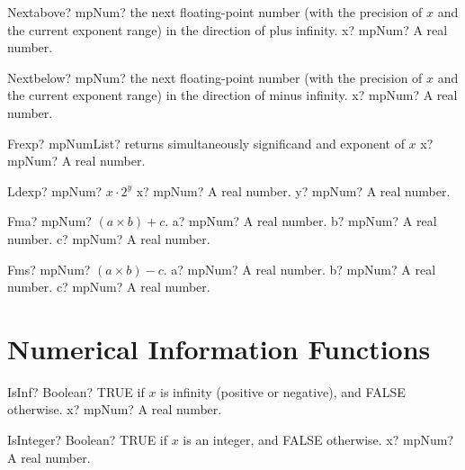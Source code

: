 \documentclass[12pt,a4paper,openany]{book}
\begin{document}
\begin{mpFunctionsExtract}
\mpFunctionOne
{Nextabove? mpNum? the next floating-point number (with the precision of $x$ and the current exponent range) in the direction of plus infinity.}
{x? mpNum? A real number.}
\end{mpFunctionsExtract}

\begin{mpFunctionsExtract}
\mpFunctionOne
{Nextbelow? mpNum? the next floating-point number (with the precision of $x$ and the current exponent range) in the direction of minus infinity.}
{x? mpNum? A real number.}
\end{mpFunctionsExtract}

\begin{mpFunctionsExtract}
\mpFunctionOne
{Frexp? mpNumList? returns simultaneously significand and exponent of $x$}
{x? mpNum? A real number.}
\end{mpFunctionsExtract}

\begin{mpFunctionsExtract}
\mpFunctionTwo
{Ldexp? mpNum? $x \cdot 2^{y}$}
{x? mpNum? A real number.}
{y? mpNum? A real number.}
\end{mpFunctionsExtract}

\begin{mpFunctionsExtract}
\mpFunctionThree
{Fma? mpNum? $(a \times b) + c$.}
{a? mpNum? A real number.}
{b? mpNum? A real number.}
{c? mpNum? A real number.}
\end{mpFunctionsExtract}

\begin{mpFunctionsExtract}
\mpFunctionThree
{Fms? mpNum? $(a \times b) - c$.}
{a? mpNum? A real number.}
{b? mpNum? A real number.}
{c? mpNum? A real number.}
\end{mpFunctionsExtract}

\section{Numerical Information Functions}

\begin{mpFunctionsExtract}
\mpFunctionOne
{IsInf? Boolean? TRUE if $x$ is infinity (positive or negative), and FALSE otherwise.}
{x? mpNum? A real number.}
\end{mpFunctionsExtract}

\begin{mpFunctionsExtract}
\mpFunctionOne
{IsInteger? Boolean? TRUE if $x$ is an integer, and FALSE otherwise.}
{x? mpNum? A real number.}
\end{mpFunctionsExtract}
\end{document}
